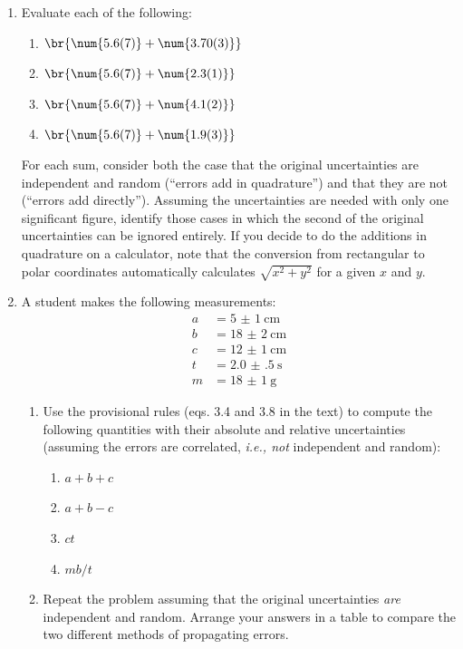 \begin{enumerate}
	\item{} Evaluate each of the following:
	\begin{enumerate}
		\item \( \br{\num{5.6(7)} + \num{3.70(3)}} \)
		
		\item \( \br{\num{5.6(7)} + \num{2.3(1)}} \)
		
		\item \( \br{\num{5.6(7)} + \num{4.1(2)}} \)
		
		\item \( \br{\num{5.6(7)} + \num{1.9(3)}} \)
	\end{enumerate}
	For each sum, consider both the case that the original uncertainties are independent and random (``errors add in quadrature'') and that they are not (``errors add directly''). 
	Assuming the uncertainties are needed with only one significant figure, identify those cases in which the second of the original uncertainties can be ignored entirely. 
	If you decide to do the additions in quadrature on a calculator, note that the conversion from rectangular to polar coordinates automatically calculates \( \sqrt{x^2 + y^2} \) for a given \( x \) and \( y \). 
	
	\item A student makes the following measurements:
		\begin{align*}
			a &= \qty{5(1)}{\cm} \\
			b &= \qty{18(2)}{\cm} \\
			c &= \qty{12(1)}{\cm} \\
			t &= \qty{2.0(5)}{\s} \\
			m &= \qty{18(1)}{\g} 
		\end{align*}
	\begin{enumerate}
		\item Use the provisional rules (eqs. 3.4 and 3.8 in the text) to compute the following quantities with their absolute and relative uncertainties (assuming the errors are correlated, \emph{i.e., not} independent and random):
		\begin{enumerate}
			\item \( a + b + c \)
			\item \( a + b - c \)
			\item \( ct \)
			\item \( mb/t \)
		\end{enumerate}
	
		\item Repeat the problem assuming that the original uncertainties \emph{are} independent and random. 
		Arrange your answers in a table to compare the two different methods of propagating errors. 
	\end{enumerate}
	

\end{enumerate}
